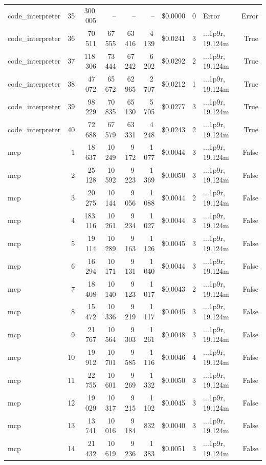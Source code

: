 \documentclass[a4paper,11pt]{article}
\begin{document}
\begin{table}[H]
{\begin{tabular}{l r r r r r r r l r}
code\_interpreter & 35 & 300\,005 & -- & -- & -- & \$0.0000 & 0 & Error & Error \\
code\_interpreter & 36 & 70\,511 & 67\,555 & 63\,416 & 4\,139 & \$0.0241 & 3 & ...1p9r, 19.124m & True \\
code\_interpreter & 37 & 118\,306 & 73\,444 & 67\,242 & 6\,202 & \$0.0292 & 2 & ...1p9r, 19.124m & True \\
code\_interpreter & 38 & 47\,072 & 65\,672 & 62\,965 & 2\,707 & \$0.0212 & 1 & ...1p9r, 19.124m & True \\
code\_interpreter & 39 & 98\,229 & 70\,835 & 65\,130 & 5\,705 & \$0.0277 & 3 & ...1p9r, 19.124m & True \\
code\_interpreter & 40 & 72\,688 & 67\,579 & 63\,331 & 4\,248 & \$0.0243 & 2 & ...1p9r, 19.124m & True \\
\midrule
mcp & 1 & 18\,637 & 10\,249 & 9\,172 & 1\,077 & \$0.0044 & 3 & ...1p9r, 19.124m & False \\
mcp & 2 & 25\,128 & 10\,592 & 9\,223 & 1\,369 & \$0.0050 & 3 & ...1p9r, 19.124m & False \\
mcp & 3 & 20\,275 & 10\,144 & 9\,056 & 1\,088 & \$0.0044 & 2 & ...1p9r, 19.124m & False \\
mcp & 4 & 183\,116 & 10\,261 & 9\,234 & 1\,027 & \$0.0044 & 3 & ...1p9r, 19.124m & False \\
mcp & 5 & 19\,114 & 10\,289 & 9\,163 & 1\,126 & \$0.0045 & 3 & ...1p9r, 19.124m & False \\
mcp & 6 & 16\,294 & 10\,171 & 9\,131 & 1\,040 & \$0.0044 & 3 & ...1p9r, 19.124m & False \\
mcp & 7 & 18\,408 & 10\,140 & 9\,123 & 1\,017 & \$0.0043 & 2 & ...1p9r, 19.124m & False \\
mcp & 8 & 15\,472 & 10\,336 & 9\,219 & 1\,117 & \$0.0045 & 3 & ...1p9r, 19.124m & False \\
mcp & 9 & 21\,767 & 10\,564 & 9\,303 & 1\,261 & \$0.0048 & 3 & ...1p9r, 19.124m & False \\
mcp & 10 & 19\,912 & 10\,701 & 9\,585 & 1\,116 & \$0.0046 & 4 & ...1p9r, 19.124m & False \\
mcp & 11 & 22\,755 & 10\,601 & 9\,269 & 1\,332 & \$0.0050 & 3 & ...1p9r, 19.124m & False \\
mcp & 12 & 19\,029 & 10\,317 & 9\,215 & 1\,102 & \$0.0045 & 3 & ...1p9r, 19.124m & False \\
mcp & 13 & 13\,741 & 10\,016 & 9\,184 & 832 & \$0.0040 & 3 & ...1p9r, 19.124m & False \\
mcp & 14 & 21\,432 & 10\,619 & 9\,236 & 1\,383 & \$0.0051 & 3 & ...1p9r, 19.124m & False \\

\end{tabular}}
\end{table}
\end{document}
